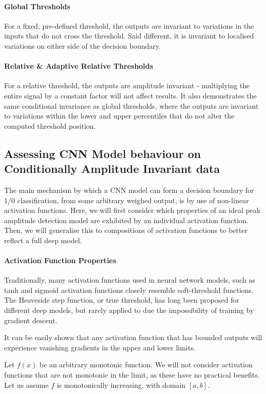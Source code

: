 \documentclass[9pt,conference]{IEEEtran}
\begin{document}
\paragraph{Global Thresholds}
For a fixed, pre-defined threshold, the outputs are invariant to variations in the inputs that do not cross the threshold. Said different, it is invariant to localised variations on either side of the decision boundary.
\paragraph{Relative \& Adaptive Relative Thresholds}
For a relative threshold, the outputs are amplitude invariant - multiplying the entire signal by a constant factor will not affect results. It also demonstrates the same conditional invariance as global thresholds, where the outputs are invariant to variations within the lower and upper percentiles that do not alter the computed threshold position.

\subsection{Assessing CNN Model behaviour on Conditionally Amplitude Invariant data}

The main mechanism by which a CNN model can form a decision boundary for 1/0 classification, from some arbitrary weighed output, is by use of non-linear activation functions. Here, we will first consider which properties of an ideal peak amplitude detection model are exhibited by an individual activation function. Then, we will generalise this to compositions of activation functions to better reflect a full deep model.

\paragraph{Activation Function Properties}
Traditionally, many activation functions used in neural network models, such as tanh and sigmoid activation functions closely resemble soft-threshold functions. The Heaveside step function, or true threshold, has long been proposed for different deep models, but rarely applied to due the impossibility of training by gradient descent.

It can be easily shown that any activation function that has bounded outputs will experience vanishing gradients in the upper and lower limits.

Let  $f\left(x\right)$ be an arbitrary monotonic function. We will not consider activation functions that are not monotonic in the limit, as these have no practical benefits. Let us assume $f$ is monotonically increasing, with domain $\left[a,b\right]$.
\end{document}
